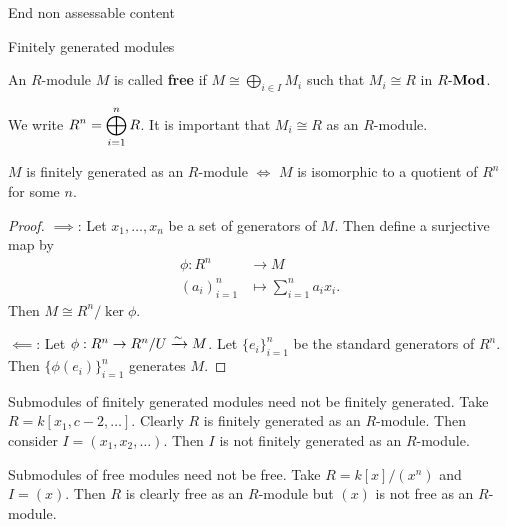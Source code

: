End non assessable content

Finitely generated modules

\begin{defn}[1.17]
	An $R$-module $M$ is called \textbf{free} if $M \cong \bigoplus_{i \in I} M_i$ such that $M_i \cong R$ in $R\mbox{-}\mathbf{Mod}$.
\end{defn}

\begin{rmk}
	\leavevmode
	\begin{enum}
		\io We write $\displaystyle R^n = \bigoplus_{i=1}^n R$.
		\io It is important that $M_i \cong R$ as an $R$-module.
	\end{enum}
\end{rmk}

\begin{prop}[1.18]
	$M$ is finitely generated as an $R$-module $\iff$ $M$ is isomorphic to a quotient of $R^n$ for some $n$.
\end{prop}

\begin{proof}
	$\implies$: Let $x_1,\ldots,x_n$ be a set of generators of $M$.
	Then define a surjective map by
	\begin{align*}
		\phi: R^n &\to M \\
		(a_i)_{i=1}^n &\mapsto \sum_{i=1}^n a_ix_i.
	\end{align*}
	Then $M \cong R^n/\ker\phi$.
	
	$\impliedby$: Let $\phi: R^n \to R^n/U \xrightarrow{\sim} M$.
	Let $\{e_i\}_{i=1}^n$ be the standard generators of $R^n$.
	Then $\{\phi(e_i)\}_{i=1}^n$ generates $M$.
\end{proof}

\begin{rmk}
	Submodules of finitely generated modules need not be finitely generated.
	Take $R=k[x_1,c-2,\ldots]$.
	Clearly $R$ is finitely generated as an $R$-module.
	Then consider $I = (x_1,x_2,\ldots)$.
	Then $I$ is not finitely generated as an $R$-module.
	
	Submodules of free modules need not be free.
	Take $R = k[x]/(x^n)$ and $I=(x)$.
	Then $R$ is clearly free as an $R$-module but $(x)$ is not free as an $R$-module.
\end{rmk}
